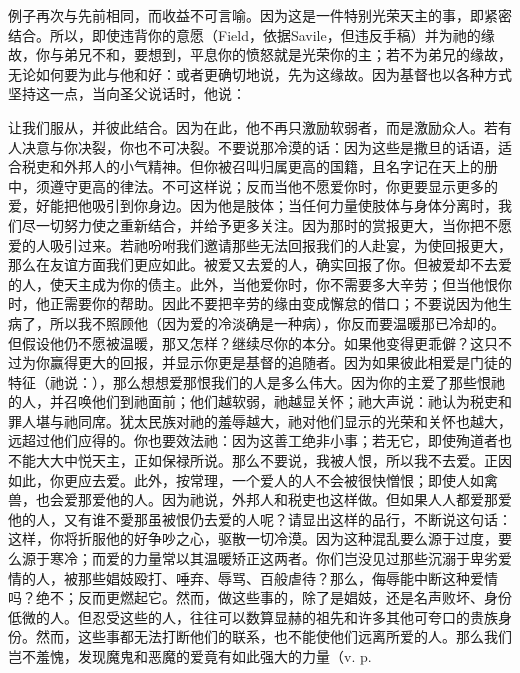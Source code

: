 例子再次与先前相同，而收益不可言喻。因为这是一件特别光荣天主的事，即紧密结合。所以，即使违背你的意愿（Field，依据Savile，但违反手稿）并为祂的缘故，你与弟兄不和，要想到，平息你的愤怒就是光荣你的主；若不为弟兄的缘故，无论如何要为此与他和好：或者更确切地说，先为这缘故。因为基督也以各种方式坚持这一点，当向圣父说话时，他说：\par

让我们服从，并彼此结合。因为在此，他不再只激励软弱者，而是激励众人。若有人决意与你决裂，你也不可决裂。不要说那冷漠的话：因为这些是撒旦的话语，适合税吏和外邦人的小气精神。但你被召叫归属更高的国籍，且名字记在天上的册中，须遵守更高的律法。不可这样说；反而当他不愿爱你时，你更要显示更多的爱，好能把他吸引到你身边。因为他是肢体；当任何力量使肢体与身体分离时，我们尽一切努力使之重新结合，并给予更多关注。因为那时的赏报更大，当你把不愿爱的人吸引过来。若祂吩咐我们邀请那些无法回报我们的人赴宴，为使回报更大，那么在友谊方面我们更应如此。被爱又去爱的人，确实回报了你。但被爱却不去爱的人，使天主成为你的债主。此外，当他爱你时，你不需要多大辛劳；但当他恨你时，他正需要你的帮助。因此不要把辛劳的缘由变成懈怠的借口；不要说因为他生病了，所以我不照顾他（因为爱的冷淡确是一种病），你反而要温暖那已冷却的。但假设他仍不愿被温暖，那又怎样？继续尽你的本分。如果他变得更乖僻？这只不过为你赢得更大的回报，并显示你更是基督的追随者。因为如果彼此相爱是门徒的特征（祂说：），那么想想爱那恨我们的人是多么伟大。因为你的主爱了那些恨祂的人，并召唤他们到祂面前；他们越软弱，祂越显关怀；祂大声说：祂认为税吏和罪人堪与祂同席。犹太民族对祂的羞辱越大，祂对他们显示的光荣和关怀也越大，远超过他们应得的。你也要效法祂：因为这善工绝非小事；若无它，即使殉道者也不能大大中悦天主，正如保禄所说。那么不要说，我被人恨，所以我不去爱。正因如此，你更应去爱。此外，按常理，一个爱人的人不会被很快憎恨；即使人如禽兽，也会爱那爱他的人。因为祂说，外邦人和税吏也这样做。但如果人人都爱那爱他的人，又有谁不愛那虽被恨仍去爱的人呢？请显出这样的品行，不断说这句话：这样，你将折服他的好争吵之心，驱散一切冷漠。因为这种混乱要么源于过度，要么源于寒冷；而爱的力量常以其温暖矫正这两者。你们岂没见过那些沉溺于卑劣爱情的人，被那些娼妓殴打、唾弃、辱骂、百般虐待？那么，侮辱能中断这种爱情吗？绝不；反而更燃起它。然而，做这些事的，除了是娼妓，还是名声败坏、身份低微的人。但忍受这些的人，往往可以数算显赫的祖先和许多其他可夸口的贵族身份。然而，这些事都无法打断他们的联系，也不能使他们远离所爱的人。那么我们岂不羞愧，发现魔鬼和恶魔的爱竟有如此强大的力量（v. p. 